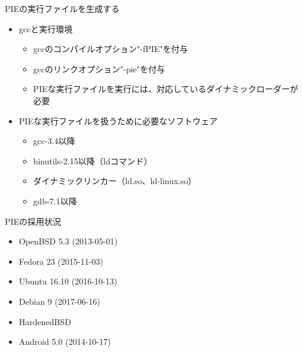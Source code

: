 \begin{frame}[containsverbatim]{PIEの実行ファイルを生成する}
  \begin{itemize}
  \item gccと実行環境
    \begin{itemize}
    \item gccのコンパイルオプション"-fPIE"を付与
    \item gccのリンクオプション"-pie"を付与
    \item PIEな実行ファイルを実行には、対応しているダイナミックローダーが必要
    \end{itemize}
  \item PIEな実行ファイルを扱うために必要なソフトウェア
    \begin{itemize}
    \item gcc-3.4以降
    \item binutils-2.15以降（ldコマンド）
    \item ダイナミックリンカー（ld.so、ld-linux.so）
    \item gdb-7.1以降
    \end{itemize}
  \end{itemize}
\end{frame}



\begin{frame}[containsverbatim]{PIEの採用状況}
  \begin{itemize}
  \item OpenBSD 5.3 (2013-05-01)
  \item Fedora 23 (2015-11-03)
  \item Ubuntu 16.10 (2016-10-13)
  \item Debian 9 (2017-06-16)
  \item HardenedBSD
  \item Android 5.0 (2014-10-17)
  \end{itemize}
\end{frame}



